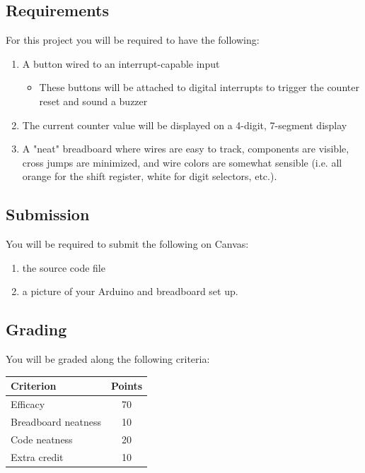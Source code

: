     \subsection*{Requirements}
    For this project you will be required to have the following:
    \begin{enumerate}
        \item A button wired to an interrupt-capable input
            \begin{itemize}
                \item These buttons will be attached to digital interrupts to trigger the counter reset and sound a buzzer
            \end{itemize}
        \item The current counter value will be displayed on a 4-digit, 7-segment display
        \item A "neat" breadboard where wires are easy to track, components are visible, cross jumps are minimized, and wire colors are somewhat sensible (i.e. all orange for the shift register, white for digit selectors, etc.).
    \end{enumerate}

    \subsection*{Submission}
    You will be required to submit the following on Canvas:
    \begin{enumerate}
        \item the source code file
        \item a picture of your Arduino and breadboard set up.
    \end{enumerate}

    \subsection*{Grading}
    You will be graded along the following criteria:

    \begin{margintable}[-0.5in]
        \begin{tabular}{ l | c }
            \toprule
            Criterion & Points \\

            \midrule
            Efficacy & 70 \\
            Breadboard neatness & 10 \\
            Code neatness & 20 \\
            Extra credit & 10 \\

            \bottomrule
        \end{tabular}
    \end{margintable}


